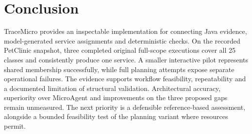 \section{Conclusion}

TraceMicro provides an inspectable implementation for connecting Java evidence, model-generated service assignments and deterministic checks. On the recorded PetClinic snapshot, three completed original full-scope executions cover all 25 classes and consistently produce one service. A smaller interactive pilot represents shared membership successfully, while full planning attempts expose separate operational failures. The evidence supports workflow feasibility, repeatability and a documented limitation of structural validation. Architectural accuracy, superiority over MicroAgent and improvements on the three proposed gaps remain unmeasured. The next priority is a defensible reference-based assessment, alongside a bounded feasibility test of the planning variant where resources permit.

